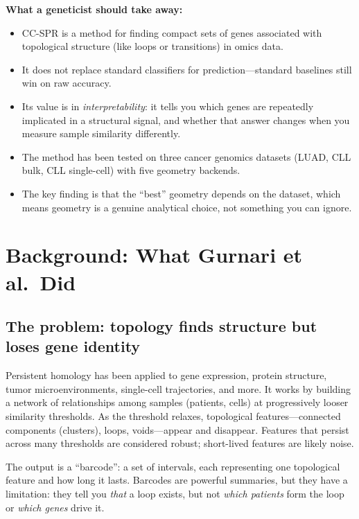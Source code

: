 \documentclass[11pt]{article}
\makeatletter
\newenvironment{keybox}{%
  \par\vspace{8pt}\noindent\fboxrule=1.5pt\fboxsep=8pt%
  \begin{lrbox}{\@tempboxa}\begin{minipage}{\dimexpr\linewidth-2\fboxsep-2\fboxrule}}%
  {\end{minipage}\end{lrbox}\fcolorbox{black}{white}{\usebox{\@tempboxa}}\par\vspace{8pt}}
\makeatother
\begin{document}
\begin{keybox}
\textbf{What a geneticist should take away:}
\begin{itemize}[leftmargin=1em]
\item CC-SPR is a method for finding compact sets of genes associated with topological structure (like loops or transitions) in omics data.
\item It does not replace standard classifiers for prediction---standard baselines still win on raw accuracy.
\item Its value is in \emph{interpretability}: it tells you which genes are repeatedly implicated in a structural signal, and whether that answer changes when you measure sample similarity differently.
\item The method has been tested on three cancer genomics datasets (LUAD, CLL bulk, CLL single-cell) with five geometry backends.
\item The key finding is that the ``best'' geometry depends on the dataset, which means geometry is a genuine analytical choice, not something you can ignore.
\end{itemize}
\end{keybox}

\section{Background: What Gurnari et al.\ Did}
\label{sec:gurnari}

\subsection{The problem: topology finds structure but loses gene identity}

Persistent homology has been applied to gene expression, protein structure, tumor microenvironments, single-cell trajectories, and more.
It works by building a network of relationships among samples (patients, cells) at progressively looser similarity thresholds.
As the threshold relaxes, topological features---connected components (clusters), loops, voids---appear and disappear.
Features that persist across many thresholds are considered robust; short-lived features are likely noise.

The output is a ``barcode'': a set of intervals, each representing one topological feature and how long it lasts.
Barcodes are powerful summaries, but they have a limitation: they tell you \emph{that} a loop exists, but not \emph{which patients} form the loop or \emph{which genes} drive it.
\end{document}
